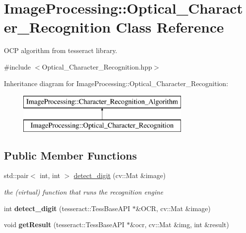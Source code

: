 \hypertarget{class_image_processing_1_1_optical___character___recognition}{}\section{Image\+Processing\+:\+:Optical\+\_\+\+Character\+\_\+\+Recognition Class Reference}
\label{class_image_processing_1_1_optical___character___recognition}


O\+CP algorithm from tesseract library.  




{\ttfamily \#include $<$Optical\+\_\+\+Character\+\_\+\+Recognition.\+hpp$>$}

Inheritance diagram for Image\+Processing\+:\+:Optical\+\_\+\+Character\+\_\+\+Recognition\+:\begin{figure}[H]
\begin{center}
\leavevmode
\includegraphics[height=2.000000cm]{class_image_processing_1_1_optical___character___recognition}
\end{center}
\end{figure}
\subsection*{Public Member Functions}
\begin{DoxyCompactItemize}
\item 
\mbox{\label{class_image_processing_1_1_optical___character___recognition_a16ff8e4bcc1f780ca6d04f996f35ba94}} 
std\+::pair$<$ int, int $>$ \mbox{\hyperlink{class_image_processing_1_1_optical___character___recognition_a16ff8e4bcc1f780ca6d04f996f35ba94}{detect\+\_\+digit}} (cv\+::\+Mat \&image)
\begin{DoxyCompactList}\small\item\em the (virtual) function that runs the recognition engine \end{DoxyCompactList}\item 
\mbox{\label{class_image_processing_1_1_optical___character___recognition_aa64266ee48775f5f4650b0a9c2650b99}} 
int {\bfseries detect\+\_\+digit} (tesseract\+::\+Tess\+Base\+A\+PI $\ast$\&O\+CR, cv\+::\+Mat \&image)
\item 
\mbox{\label{class_image_processing_1_1_optical___character___recognition_a3d771aa1f61b0b2f96bc09310c18a001}} 
void {\bfseries get\+Result} (tesseract\+::\+Tess\+Base\+A\+PI $\ast$\&ocr, cv\+::\+Mat \&img, int \&result)
\end{DoxyCompactItemize}
